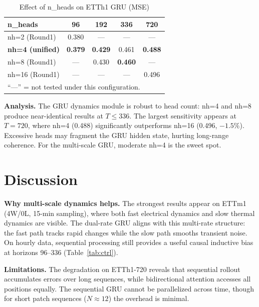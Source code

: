 \documentclass[conference]{IEEEtran}
\begin{document}
\begin{table}[htbp]
\caption{Effect of n\_heads on ETTh1 GRU (MSE)}
\begin{center}
{\small
\begin{tabular}{lcccc}
\toprule
n\_heads & 96 & 192 & 336 & 720 \\
\midrule
nh=2 (Round1) & 0.380 & — & — & — \\
\textbf{nh=4 (unified)} & \textbf{0.379} & \textbf{0.429} & 0.461 & \textbf{0.488} \\
nh=8 (Round1) & — & 0.430 & \textbf{0.460} & — \\
nh=16 (Round1) & — & — & — & 0.496 \\
\bottomrule
\multicolumn{5}{l}{\footnotesize ``—'' = not tested under this configuration.}
\end{tabular}
}
\label{tab:nh}
\end{center}
\end{table}

\textbf{Analysis.} The GRU dynamics module is robust to head count: nh=4 and nh=8 produce near-identical results at $T{\leq}336$. The largest sensitivity appears at $T{=}720$, where nh=4 (0.488) significantly outperforms nh=16 (0.496, $-1.5\%$). Excessive heads may fragment the GRU hidden state, hurting long-range coherence. For the multi-scale GRU, moderate nh=4 is the sweet spot.

\section{Discussion}

\textbf{Why multi-scale dynamics helps.} The strongest results appear on ETTm1 (4W/0L, 15-min sampling), where both fast electrical dynamics and slow thermal dynamics are visible. The dual-rate GRU aligns with this multi-rate structure: the fast path tracks rapid changes while the slow path smooths transient noise. On hourly data, sequential processing still provides a useful causal inductive bias at horizons 96--336 (Table~\ref{tab:ctrl}).

\textbf{Limitations.} The degradation on ETTh1-720 reveals that sequential rollout accumulates errors over long sequences, while bidirectional attention accesses all positions equally. The sequential GRU cannot be parallelized across time, though for short patch sequences ($N{\approx}12$) the overhead is minimal.

\end{document}
